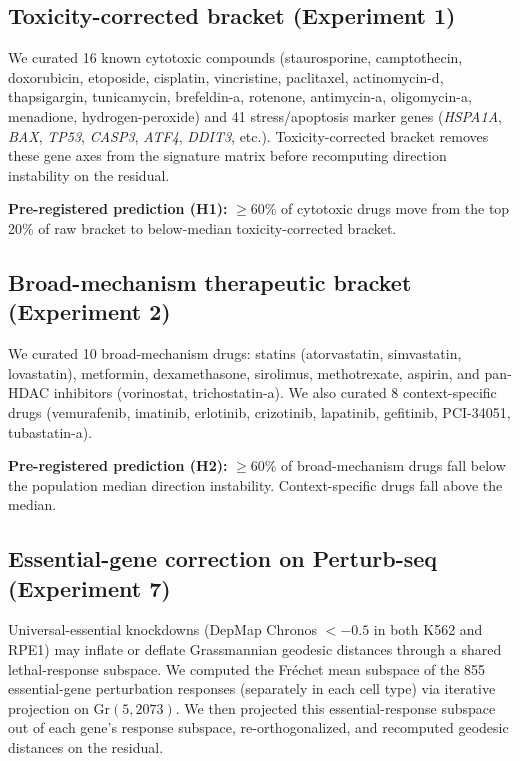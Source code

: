 \documentclass{article}
\begin{document}
\subsection{Toxicity-corrected bracket (Experiment 1)}

We curated 16 known cytotoxic compounds (staurosporine, camptothecin,
doxorubicin, etoposide, cisplatin, vincristine, paclitaxel, actinomycin-d,
thapsigargin, tunicamycin, brefeldin-a, rotenone, antimycin-a, oligomycin-a,
menadione, hydrogen-peroxide) and 41 stress/apoptosis marker genes
(\emph{HSPA1A}, \emph{BAX}, \emph{TP53}, \emph{CASP3}, \emph{ATF4},
\emph{DDIT3}, etc.). Toxicity-corrected bracket removes these gene axes from
the signature matrix before recomputing direction instability on the residual.

\textbf{Pre-registered prediction (H1):} $\geq$60\% of cytotoxic drugs move
from the top 20\% of raw bracket to below-median toxicity-corrected bracket.

\subsection{Broad-mechanism therapeutic bracket (Experiment 2)}

We curated 10 broad-mechanism drugs: statins (atorvastatin, simvastatin,
lovastatin), metformin, dexamethasone, sirolimus, methotrexate, aspirin,
and pan-HDAC inhibitors (vorinostat, trichostatin-a). We also curated 8
context-specific drugs (vemurafenib, imatinib, erlotinib, crizotinib,
lapatinib, gefitinib, PCI-34051, tubastatin-a).

\textbf{Pre-registered prediction (H2):} $\geq$60\% of broad-mechanism drugs
fall below the population median direction instability. Context-specific
drugs fall above the median.

\subsection{Essential-gene correction on Perturb-seq (Experiment 7)}

Universal-essential knockdowns (DepMap Chronos $< -0.5$ in both K562 and
RPE1) may inflate or deflate Grassmannian geodesic distances through a
shared lethal-response subspace. We computed the Fr\'echet mean subspace of
the 855 essential-gene perturbation responses (separately in each cell type)
via iterative projection on Gr$(5, 2073)$. We then projected this
essential-response subspace out of each gene's response subspace,
re-orthogonalized, and recomputed geodesic distances on the residual.
\end{document}
